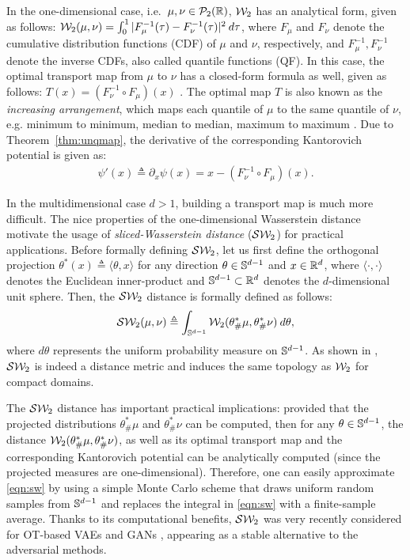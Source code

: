 %
In the one-dimensional case, i.e.\ $\mu,\nu \in {\cal P}_2(\mathbb{R})$, ${\cal W}_2$ has an analytical form, given as follows:
${\cal W}_2(\mu,\nu) = \int_0^1 |F_\mu^{-1}(\tau) - F_\nu^{-1}(\tau)|^2 \> d\tau$, %
where $F_\mu$ and $F_\nu$ denote the cumulative distribution functions (CDF) of $\mu$ and $\nu$, respectively, and $F^{-1}_\mu, F^{-1}_\nu$ denote the inverse CDFs, also called quantile functions (QF).
%
In this case, the optimal transport map from $\mu$ to $\nu$  has a closed-form formula as well, given as follows: $T(x) = (F_\nu^{-1} \circ F_\mu) (x)$ \cite{villani2008optimal}. The optimal map $T$ is also known as the \emph{increasing arrangement}, which maps each quantile of $\mu$ to the same quantile of $\nu$, e.g. minimum to minimum, median to median, maximum to maximum \cite{villani2008optimal}.
%
Due to Theorem~\ref{thm:unqmap}, the derivative of the corresponding Kantorovich potential is given as:
\begin{align*}
\psi'(x) \triangleq \partial_x \psi(x) = x- (F_\nu^{-1} \circ F_\mu) (x).
\end{align*}

In the multidimensional case $d > 1$, building a transport map is much more difficult. The nice properties of the one-dimensional Wasserstein distance motivate the usage of \emph{sliced-Wasserstein distance} (${\cal S}{\cal W}_2$) for practical applications. Before formally defining ${\cal S}{\cal W}_2$, let us first define the orthogonal projection $\theta^* (x) \triangleq \langle \theta, x \rangle$ for any direction $\theta \in \mathbb{S}^{d-1}$ and $x \in \mathbb{R}^d$, where $\langle \cdot, \cdot \rangle$ denotes the Euclidean inner-product and $\mathbb{S}^{d-1} \subset \mathbb{R}^d$ denotes the $d$-dimensional unit sphere. Then, the ${\cal S}{\cal W}_2$ distance is formally defined as follows:
\begin{align}
{\cal S}{\cal W}_2(\mu,\nu) \triangleq \int_{\mathbb{S}^{d-1}} {\cal W}_2 (\theta^*_\#\mu, \theta^*_\#\nu) \> d \theta, \label{eqn:sw}
\end{align}
where $d\theta$ represents the uniform probability measure on $\mathbb{S}^{d-1}$. As shown in \cite{bonnotte2013unidimensional}, ${\cal S}{\cal W}_2$ is indeed a distance metric and induces the same topology as ${\cal W}_2$ for compact domains.

The ${\cal S}{\cal W}_2$ distance has important practical implications: provided that the projected distributions $\theta^*_\#\mu$ and $\theta^*_\#\nu$ can be computed, then for any $\theta \in \mathbb{S}^{d-1}$, the distance ${\cal W}_2 (\theta^*_\#\mu, \theta^*_\#\nu)$, as well as its optimal transport map and the corresponding Kantorovich potential can be analytically computed (since the projected measures are one-dimensional). Therefore, one can easily approximate \eqref{eqn:sw} by using a simple Monte Carlo scheme that draws uniform random samples from $\mathbb{S}^{d-1}$ and replaces the integral in \eqref{eqn:sw} with a finite-sample average. Thanks to its computational benefits, ${\cal S}{\cal W}_2$ was very recently considered for OT-based VAEs and GANs \cite{deshpande2018generative,autotranspoter,kolouri2018sliced}, appearing as a stable alternative to the adversarial methods.





